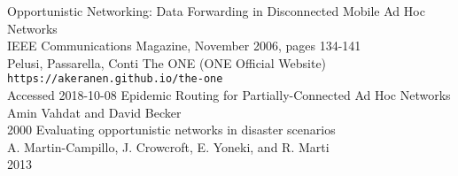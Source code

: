\documentclass[12pt]{report}
\begin{document}
\begin{thebibliography}{0}
    Opportunistic Networking: Data Forwarding in Disconnected Mobile Ad Hoc Networks\\
    IEEE Communications Magazine, November 2006, pages 134-141\\
    Pelusi, Passarella, Conti
    The ONE (ONE Official Website)\\
    \verb|https://akeranen.github.io/the-one|\\
    Accessed 2018-10-08
    Epidemic Routing for Partially-Connected Ad Hoc Networks\\
    Amin Vahdat and David Becker\\
    2000
    Evaluating opportunistic networks in disaster scenarios\\
    A. Martin-Campillo, J. Crowcroft, E. Yoneki, and R. Marti\\
    2013
\end{thebibliography}
\end{document}
